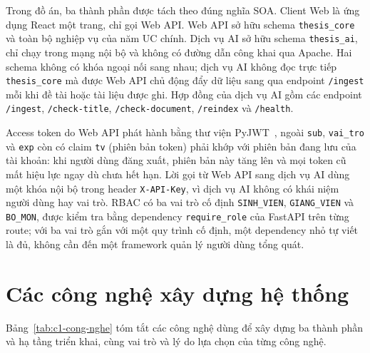 \documentclass[../main.tex]{subfiles}
\begin{document}
Trong đồ án, ba thành phần được tách theo đúng nghĩa SOA. Client Web là ứng dụng React một trang, chỉ gọi Web API. Web API sở hữu schema \texttt{thesis\_core} và toàn bộ nghiệp vụ của năm UC chính. Dịch vụ AI sở hữu schema \texttt{thesis\_ai}, chỉ chạy trong mạng nội bộ và không có đường dẫn công khai qua Apache. Hai schema không có khóa ngoại nối sang nhau; dịch vụ AI không đọc trực tiếp \texttt{thesis\_core} mà được Web API chủ động đẩy dữ liệu sang qua endpoint \texttt{/ingest} mỗi khi đề tài hoặc tài liệu được ghi. Hợp đồng của dịch vụ AI gồm các endpoint \texttt{/ingest}, \texttt{/check-title}, \texttt{/check-document}, \texttt{/reindex} và \texttt{/health}.

Access token do Web API phát hành bằng thư viện PyJWT~\cite{pyjwt}, ngoài \texttt{sub}, \texttt{vai\_tro} và \texttt{exp} còn có claim \texttt{tv} (phiên bản token) phải khớp với phiên bản đang lưu của tài khoản: khi người dùng đăng xuất, phiên bản này tăng lên và mọi token cũ mất hiệu lực ngay dù chưa hết hạn. Lời gọi từ Web API sang dịch vụ AI dùng một khóa nội bộ trong header \texttt{X-API-Key}, vì dịch vụ AI không có khái niệm người dùng hay vai trò. RBAC có ba vai trò cố định \texttt{SINH\_VIEN}, \texttt{GIANG\_VIEN} và \texttt{BO\_MON}, được kiểm tra bằng dependency \texttt{require\_role} của FastAPI trên từng route; với ba vai trò gắn với một quy trình cố định, một dependency nhỏ tự viết là đủ, không cần đến một framework quản lý người dùng tổng quát.

\section{Các công nghệ xây dựng hệ thống}\label{sec:c1-cong-nghe}

Bảng~\ref{tab:c1-cong-nghe} tóm tắt các công nghệ dùng để xây dựng ba thành phần và hạ tầng triển khai, cùng vai trò và lý do lựa chọn của từng công nghệ.
\end{document}

